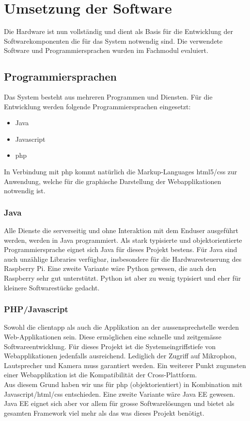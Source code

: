 \section{Umsetzung der Software}
\label{sec:chapterexample}
Die Hardware ist nun vollständig und dient als Basis für die Entwicklung der Softwarekomponenten die für das System notwendig sind. Die verwendete Software und Programmiersprachen wurden im Fachmodul evaluiert.
\subsection{Programmiersprachen}
Das System besteht aus mehreren Programmen und Diensten. Für die Entwicklung werden folgende Programmiersprachen eingesetzt:
\begin{itemize}
	\item Java
	\item Javascript
	\item \gls{php}
\end{itemize}
In Verbindung mit \gls{php} kommt natürlich die Markup-Languages \gls{html}5/\gls{css} zur Anwendung, welche für die graphische Darstellung der Webapplikationen notwendig ist.

\subsubsection{Java}
\label{kap:java}
Alle Dienste die serverseitig und ohne Interaktion mit dem Enduser ausgeführt werden, werden in Java programmiert. Als stark typisierte und objektorientierte Programmiersprache eignet sich Java für dieses Projekt bestens. Für Java sind auch unzählige Libraries verfügbar, insbesondere für die Hardwaresteuerung des Raspberry Pi. Eine zweite Variante wäre Python gewesen, die auch den Raspberry sehr gut unterstützt. Python ist aber zu wenig typisiert und eher für kleinere Softwarestücke gedacht.

\subsubsection{PHP/Javascript}
Sowohl die \gls{clientapp} als auch die Applikation an der \gls{aussensprechstelle} werden Web-Applikationen sein. Diese ermöglichen eine schnelle und zeitgemässe Softwareentwicklung. Für dieses Projekt ist die Systemeingriffstiefe von Webapplikationen jedenfalls ausreichend. Lediglich der Zugriff auf Mikrophon, Lautsprecher und Kamera muss garantiert werden. Ein weiterer Punkt zugunsten einer Webapplikation ist die Kompatibilität der Cross-Plattform.
\\
Aus diesem Grund haben wir uns für \gls{php} (objektorientiert) in Kombination mit Javascript/\gls{html}/\gls{css} entschieden. Eine zweite Variante wäre Java EE gewesen. Java EE eignet sich aber vor allem für grosse Softwarelösungen und bietet als gesamten Framework viel mehr als das was dieses Projekt benötigt.
\\
